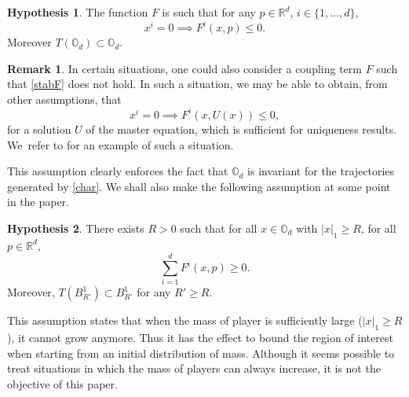 \documentclass[10pt]{amsart}
\theoremstyle{definition}
\newtheorem{Rem}{Remark}[section]
\newtheorem{hyp}{Hypothesis}
\begin{document}
\begin{hyp}\label{stab}
The function $F$ is such that for any $p \in \mathbb{R}^d$, $i\in \{1,\dots,d\}$,
\begin{equation}\label{stabF}
x^i = 0 \implies F^i(x,p) \leq 0.
\end{equation}
Moreover $T(\mathbb{O}_d) \subset \mathbb{O}_d$.
\end{hyp}
\begin{Rem}
In certain situations, one could also consider a coupling term $F$ such that \eqref{stabF} does not hold. In such a situation, we may be able to obtain, from other assumptions, that
\begin{equation*}
x^i = 0 \implies F^i(x,U(x)) \leq 0,
\end{equation*}
for a solution $U$ of the master equation, which is sufficient for uniqueness results. We~refer to \cite{bertucci2020mean} for an example of such a situation.
\end{Rem}
This assumption clearly enforces the fact that $\mathbb{O}_d$ is invariant for the trajectories generated by \eqref{char}. We shall also make the following assumption at some point in the paper.
\begin{hyp}\label{grow}
There exists $R > 0$ such that for all $x \in \mathbb{O}_d$ with $|x|_1 \geq R$, for all $p \in \mathbb{R}^d$,
\begin{equation*}
\sum_{i = 1}^d F^i(x,p) \geq 0.
\end{equation*}
Moreover, $T(B^1_{R'}) \subset B^1_{R'}$ for any $R' \geq R$.
\end{hyp}
This assumption states that when the mass of player is sufficiently large ($|x|_1 \geq R$), it cannot grow anymore. Thus it has the effect to bound the region of interest when starting from an initial distribution of mass. Although it seems possible to treat situations in which the mass of players can always increase, it is not the objective of this paper.
\end{document}
